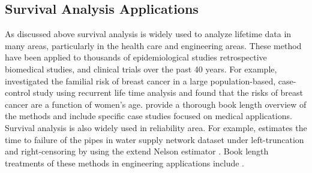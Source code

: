 \documentclass[12pt,letterpaper]{article}
\begin{document}
\subsection{Survival Analysis Applications}
As discussed above survival analysis is widely used to analyze lifetime data in many areas, particularly in the health care and engineering areas.  These method have been applied to thousands of epidemiological studies retrospective biomedical studies, and clinical trials over the past 40 years.
For example, \citet{claus1991} investigated the familial risk of breast cancer in a large population-based, case-control study using recurrent life time analysis and found that the risks of breast cancer are a function of women's age.  \citet{Kleinmoeschberger2003} provide a thorough book length overview of the methods and include specific case studies focused on medical applications.
Survival analysis is also widely used in reliability area. For example, \citet{carrion2010} estimates the time to failure of the pipes in water supply network dataset under left-truncation and right-censoring by using the extend Nelson estimator \citep{pan1998}.  Book length treatments of these methods in engineering applications include \citet{lawless2011,meeker2014}.
\end{document}
